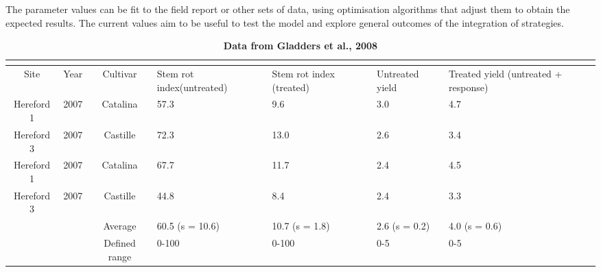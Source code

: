 \documentclass{article}
\begin{document}
The parameter values can be fit to the field report or other sets of data, using optimisation algorithms that adjust them to obtain the expected results. The current values aim to be useful to test the model and explore general outcomes of the integration of strategies. 


\begin{table}[h]
\caption{\label{table:data}\textbf{Data from Gladders et al., 2008}}
\begin{tabular}{cccp{20mm}p{20mm}p{20mm}p{20mm}} %
	\multicolumn{7}{c}{}\\
	\hline
	Site & Year & Cultivar & Stem rot \newline index\newline (untreated) & Stem rot \newline index \newline (treated) & Untreated yield & Treated yield (untreated + response)\\
	\hline
	Hereford 1 & 2007 & Catalina & 57.3 & 9.6 & 3.0 & 4.7 \\
	Hereford 3 & 2007 & Castille & 72.3 & 13.0 & 2.6 & 3.4 \\
	Hereford 1 & 2007 &Catalina & 67.7 & 11.7 & 2.4 & 4.5 \\
	Hereford 3& 2007& Castille & 44.8 & 8.4 & 2.4 & 3.3 \\
	\hline
	 &  & Average & 60.5 \newline (s = 10.6) & 10.7 \newline (s = 1.8) & 2.6 \newline (s = 0.2) & 4.0 \newline (s = 0.6) \\
	 \hline
	 &  & Defined range & 0-100 & 0-100 & 0-5 & 0-5 \\
	\hline
\end{tabular}
\end{table}
\end{document}
